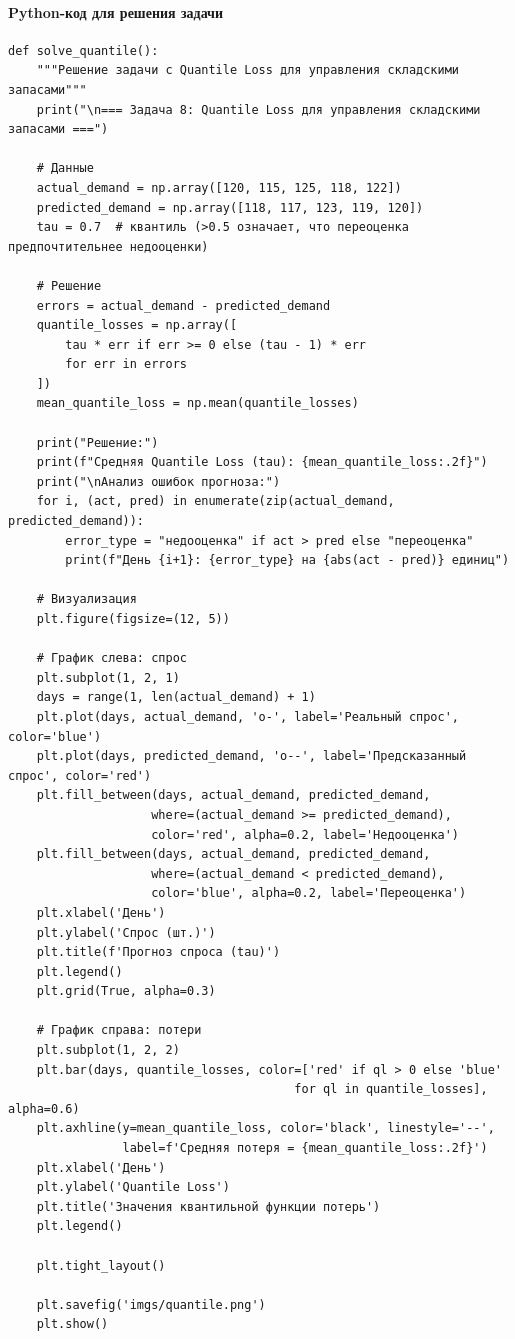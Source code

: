 \paragraph*{Python-код для решения задачи}
\begin{verbatim}
def solve_quantile():
    """Решение задачи с Quantile Loss для управления складскими запасами"""
    print("\n=== Задача 8: Quantile Loss для управления складскими запасами ===")
    
    # Данные
    actual_demand = np.array([120, 115, 125, 118, 122])
    predicted_demand = np.array([118, 117, 123, 119, 120])
    tau = 0.7  # квантиль (>0.5 означает, что переоценка предпочтительнее недооценки)
    
    # Решение
    errors = actual_demand - predicted_demand
    quantile_losses = np.array([
        tau * err if err >= 0 else (tau - 1) * err
        for err in errors
    ])
    mean_quantile_loss = np.mean(quantile_losses)
    
    print("Решение:")
    print(f"Средняя Quantile Loss (tau): {mean_quantile_loss:.2f}")
    print("\nАнализ ошибок прогноза:")
    for i, (act, pred) in enumerate(zip(actual_demand, predicted_demand)):
        error_type = "недооценка" if act > pred else "переоценка"
        print(f"День {i+1}: {error_type} на {abs(act - pred)} единиц")
    
    # Визуализация
    plt.figure(figsize=(12, 5))
    
    # График слева: спрос
    plt.subplot(1, 2, 1)
    days = range(1, len(actual_demand) + 1)
    plt.plot(days, actual_demand, 'o-', label='Реальный спрос', color='blue')
    plt.plot(days, predicted_demand, 'o--', label='Предсказанный спрос', color='red')
    plt.fill_between(days, actual_demand, predicted_demand, 
                    where=(actual_demand >= predicted_demand),
                    color='red', alpha=0.2, label='Недооценка')
    plt.fill_between(days, actual_demand, predicted_demand,
                    where=(actual_demand < predicted_demand),
                    color='blue', alpha=0.2, label='Переоценка')
    plt.xlabel('День')
    plt.ylabel('Спрос (шт.)')
    plt.title(f'Прогноз спроса (tau)')
    plt.legend()
    plt.grid(True, alpha=0.3)
    
    # График справа: потери
    plt.subplot(1, 2, 2)
    plt.bar(days, quantile_losses, color=['red' if ql > 0 else 'blue' 
                                        for ql in quantile_losses], alpha=0.6)
    plt.axhline(y=mean_quantile_loss, color='black', linestyle='--',
                label=f'Средняя потеря = {mean_quantile_loss:.2f}')
    plt.xlabel('День')
    plt.ylabel('Quantile Loss')
    plt.title('Значения квантильной функции потерь')
    plt.legend()
    
    plt.tight_layout()
    
    plt.savefig('imgs/quantile.png')
    plt.show()

\end{verbatim}

